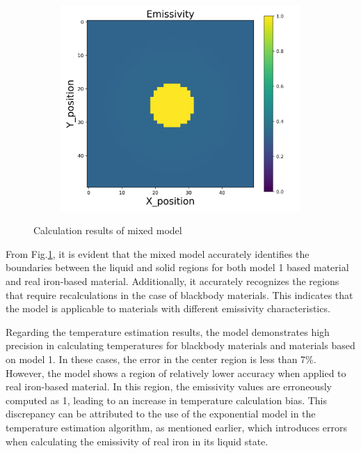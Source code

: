 \begin{figure}[htbp]
\begin{minipage}{\textwidth}
\begin{subfigure}{0.325\textwidth}
        \end{subfigure}
        \begin{subfigure}{0.325\textwidth}
            \centering
            \includegraphics[width=\textwidth]{figures/raw_data/5/mix/emi_cal.jpg}
        \end{subfigure}
    \end{minipage}
    \caption{Calculation results of mixed model}
    \label{fig: result_mixed_model}
\end{figure}


From Fig.\ref{fig: result_mixed_model}, it is evident that the mixed model 
accurately identifies the boundaries between the liquid and solid regions 
for both model 1 based material and real iron-based material. 
Additionally, it accurately recognizes the regions that require 
recalculations in the case of blackbody materials. This indicates that 
the model is applicable to materials with different emissivity characteristics.


Regarding the temperature estimation results, the model demonstrates high 
precision in calculating temperatures for blackbody materials and materials 
based on model 1. In these cases, the error in the center region is less than 7\%. 
However, the model shows a region of relatively lower accuracy when 
applied to real iron-based material. In this region, the emissivity values 
are erroneously computed as 1, leading to an increase in temperature 
calculation bias. This discrepancy can be attributed to the use of the 
exponential model in the temperature estimation algorithm, as mentioned 
earlier, which introduces errors when calculating the emissivity 
of real iron in its liquid state.


